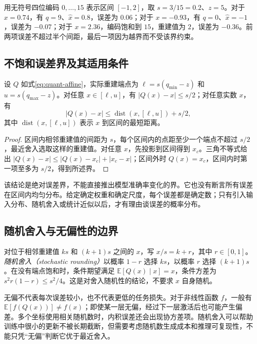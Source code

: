 \documentclass[UTF8,12pt,a4paper,fontset=fandol]{ctexart}
\begin{document}
\begin{example}[带零点的四位量化]
用无符号四位编码 $0,\ldots,15$ 表示区间 $[-1,2]$，取 $s=3/15=0.2$、$z=5$。对于 $x=0.74$，有 $q=9$、$\widehat x=0.8$，误差为 $0.06$；对于 $x=-0.93$，有 $q=0$、$\widehat x=-1$，误差为 $-0.07$；对于 $x=2.36$，编码饱和到 $15$，重建值为 $2$，误差为 $-0.36$。前两项误差不超过半个间距，最后一项因为越界而不受该界约束。
\end{example}

\subsection{不饱和误差界及其适用条件}
\begin{proposition}[最近网格投影的误差界]
设 $Q$ 如式\eqref{eq:quant-affine}，实际重建端点为 $\ell=s(q_{\min}-z)$ 和 $u=s(q_{\max}-z)$。对任意 $x\in[\ell,u]$，有 $|Q(x)-x|\leq s/2$；对任意实数 $x$，有
\begin{equation}
 |Q(x)-x|\leq \operatorname{dist}(x,[\ell,u])+s/2,
 \label{eq:quant-pointwise-bound}
\end{equation}
其中 $\operatorname{dist}(x,[\ell,u])$ 表示 $x$ 到区间的最短距离。
\end{proposition}
\begin{proof}
区间内相邻重建值的间距为 $s$，每个区间内的点距至少一个端点不超过 $s/2$，最近舍入选取这样的重建值。对任意 $x$，先投影到区间得到 $x_c$。三角不等式给出 $|Q(x)-x|\leq|Q(x)-x_c|+|x_c-x|$；区间外时 $Q(x)=x_c$，区间内时第一项至多为 $s/2$，得到所述界。
\end{proof}
该结论是绝对误差界，不能直接推出模型准确率变化的界。它也没有断言所有误差在区间内均匀分布。给定确定权重和确定尺度，每个误差都是确定数；只有引入输入分布、随机舍入或统计近似以后，才有理由谈误差的概率分布。

\subsection{随机舍入与无偏性的边界}
对位于相邻重建值 $ks$ 和 $(k+1)s$ 之间的 $x$，写 $x/s=k+r$，其中 $r\in[0,1]$。\emph{随机舍入（stochastic rounding）}以概率 $1-r$ 选择 $ks$，以概率 $r$ 选择 $(k+1)s$。在没有端点饱和时，条件期望满足 $\mathbb E[Q(x)\mid x]=x$，条件方差为 $s^2r(1-r)\leq s^2/4$。这是对舍入随机性的结论，不要求 $x$ 自身随机。

无偏不代表每次误差较小，也不代表更低的任务损失。对于非线性函数 $f$，一般有 $\mathbb E[f(Q(x))]\ne f(x)$；即使某一层无偏，经过下一层激活后也可能产生偏差。多个坐标使用相关随机数时，内积误差还会出现协方差项。随机舍入可以帮助训练中很小的更新不被长期截断，但需要考虑随机数生成成本和推理可复现性，不能只凭“无偏”判断它优于最近舍入。
\end{document}
